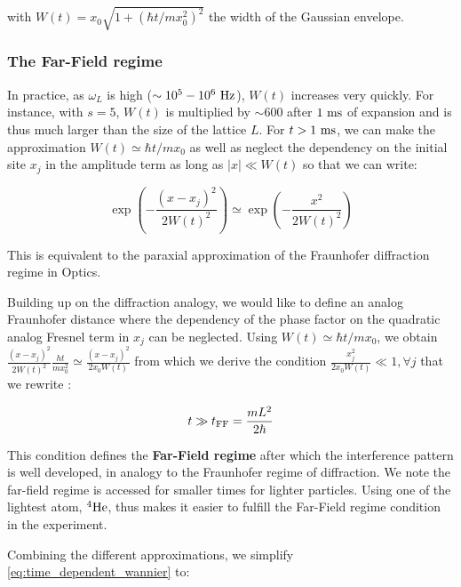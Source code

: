 \noindent with $W(t)=x_{0} \sqrt{1+\left(\hbar t / m x_{0}^{2}\right)^{2}}$ the width of the Gaussian envelope.

\subsubsection{The Far-Field regime}

In practice, as $\omega_L$ is high ($\sim 10^5-10^6 \ \rm{Hz}$), $W(t)$ increases very quickly. For instance, with $s=5$, $W(t)$ is multiplied by $\sim 600$ after $1 \ \rm{ms}$ of expansion and is thus much larger than the size of the lattice $L$. For $t>1 \ \rm{ms}$, we can make the approximation $W(t) \simeq \hbar t/m x_0$ as well as neglect the dependency on the initial site $x_j$ in the amplitude term as long as $|x| \ll W(t)$ so that we can write:

\begin{equation}
    \exp \left(-\frac{\left(x-x_{j}\right)^{2}}{2 W(t)^{2}}\right) \simeq \exp \left(-\frac{x^{2}}{2 W(t)^{2}}\right)
\end{equation}

\noindent This is equivalent to the paraxial approximation of the Fraunhofer diffraction regime in Optics.

Building up on the diffraction analogy, we would like to define an analog Fraunhofer distance where the dependency of the phase factor on the quadratic analog Fresnel term in $x_j$ can be neglected. Using $W(t) \simeq \hbar t/m x_0$, we obtain $\frac{\left(x-x_{j}\right)^{2}}{2 W(t)^{2}} \frac{h t}{m x_{0}^{2}} \simeq \frac{\left(x-x_{j}\right)^{2}}{2 x_0 W(t)}$ from which we derive the condition $\frac{x_j^2}{2 x_0 W(t)} \ll 1, \forall j$ that we rewrite \cite{gerbier2008expansion,toth2008theory}:

\begin{equation}
    t \gg t_{\rm{FF}} = \frac{mL^2}{2 \hbar}
    \label{eq:far_field}
\end{equation}

\noindent This condition defines the \textbf{Far-Field regime} after which the interference pattern is well developed, in analogy to the Fraunhofer regime of diffraction. We note the far-field regime is accessed for smaller times for lighter particles. Using one of the lightest atom, $^4 \rm{He}$, thus makes it easier to fulfill the Far-Field regime condition in the experiment. 

Combining the different approximations, we simplify \ref{eq:time_dependent_wannier} to:

